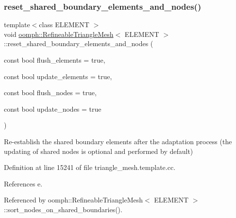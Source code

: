 \mbox{\label{classoomph_1_1RefineableTriangleMesh_a43f080841444e0d085669db4ae580f2f}} 
\subsubsection{\texorpdfstring{reset\+\_\+shared\+\_\+boundary\+\_\+elements\+\_\+and\+\_\+nodes()}{reset\_shared\_boundary\_elements\_and\_nodes()}}
{\footnotesize\ttfamily template$<$class E\+L\+E\+M\+E\+NT $>$ \\
void \hyperlink{classoomph_1_1RefineableTriangleMesh}{oomph\+::\+Refineable\+Triangle\+Mesh}$<$ E\+L\+E\+M\+E\+NT $>$\+::reset\+\_\+shared\+\_\+boundary\+\_\+elements\+\_\+and\+\_\+nodes (\begin{DoxyParamCaption}\item[{const bool}]{flush\+\_\+elements = {\ttfamily true},  }\item[{const bool}]{update\+\_\+elements = {\ttfamily true},  }\item[{const bool}]{flush\+\_\+nodes = {\ttfamily true},  }\item[{const bool}]{update\+\_\+nodes = {\ttfamily true} }\end{DoxyParamCaption})\hspace{0.3cm}{\ttfamily [protected]}}



Re-\/establish the shared boundary elements after the adaptation process (the updating of shared nodes is optional and performed by default) 



Definition at line 15241 of file triangle\+\_\+mesh.\+template.\+cc.



References e.



Referenced by oomph\+::\+Refineable\+Triangle\+Mesh$<$ E\+L\+E\+M\+E\+N\+T $>$\+::sort\+\_\+nodes\+\_\+on\+\_\+shared\+\_\+boundaries().

\mbox{\label{classoomph_1_1RefineableTriangleMesh_a844986a9cfbce009209f0e01ef5f5918}} 
